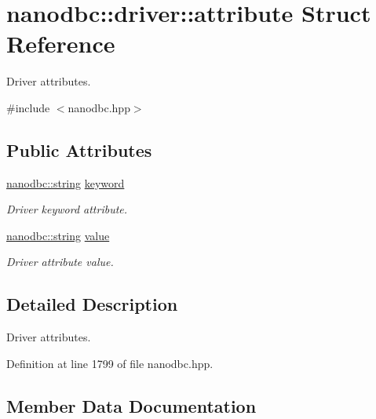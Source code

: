 \hypertarget{structnanodbc_1_1driver_1_1attribute}{}\section{nanodbc\+::driver\+::attribute Struct Reference}
\label{structnanodbc_1_1driver_1_1attribute}


Driver attributes.  




{\ttfamily \#include $<$nanodbc.\+hpp$>$}

\subsection*{Public Attributes}
\begin{DoxyCompactItemize}
\item 
\mbox{\hyperlink{namespacenanodbc_abfc0ece56278e590911ec8352774c212}{nanodbc\+::string}} \mbox{\hyperlink{structnanodbc_1_1driver_1_1attribute_a8f1199608c01a5c198abe92d9094efb5}{keyword}}
\begin{DoxyCompactList}\small\item\em Driver keyword attribute. \end{DoxyCompactList}\item 
\mbox{\hyperlink{namespacenanodbc_abfc0ece56278e590911ec8352774c212}{nanodbc\+::string}} \mbox{\hyperlink{structnanodbc_1_1driver_1_1attribute_abd20e9eff35a81c877c01eaac6c9adaa}{value}}
\begin{DoxyCompactList}\small\item\em Driver attribute value. \end{DoxyCompactList}\end{DoxyCompactItemize}


\subsection{Detailed Description}
Driver attributes. 

Definition at line 1799 of file nanodbc.\+hpp.



\subsection{Member Data Documentation}
\mbox{\label{structnanodbc_1_1driver_1_1attribute_a8f1199608c01a5c198abe92d9094efb5}} 
